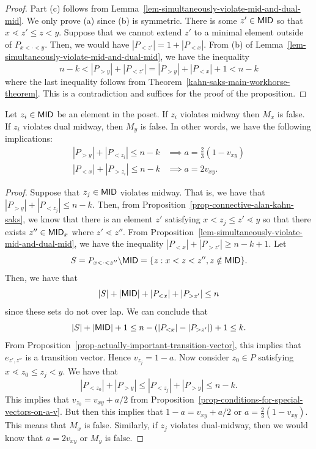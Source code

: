 \documentclass{puthesis-UG}
\begin{document}
\begin{proof}
 	Part (c) follows from Lemma~\ref{lem-simultaneously-violate-mid-and-dual-mid}. We only prove (a) since (b) is symmetric. There is some $z' \in \mathsf{MID}$ so that $x \lessdot z' \leq z < y$. Suppose that we cannot extend $z'$ to a minimal element outside of $P_{x< \cdot < y}$. Then, we would have $|P_{< z'}| = 1 + |P_{< x}|$. From (b) of Lemma~\ref{lem-simultaneously-violate-mid-and-dual-mid}, we have the inequality 
 	\[
 		n-k < |P_{> y}| + |P_{< z'}| = |P_{> y}| + |P_{< x}| + 1 < n-k
 	\]
 	where the last inequality follows from Theorem~\ref{kahn-saks-main-workhorse-theorem}. This is a contradiction and suffices for the proof of the proposition. 
\end{proof}

\begin{lem} \label{lem-midway-then-mx-false-and-other-version}
	Let $z_i \in \mathsf{MID}$ be an element in the poset. If $z_i$ violates midway then $M_x$ is false. If $z_i$ violates dual midway, then $M_y$ is false. In other words, we have the following implications:
	\begin{align*}
		|P_{> y}| + |P_{< z_i}| \leq n-k & \implies a = \frac{2}{3} (1 - v_{xy}) \\
		|P_{< x}| + |P_{> z_i}| \leq n-k & \implies a = 2v_{xy}. 
	\end{align*}
\end{lem}

\begin{proof}
	Suppose that $z_j \in \mathsf{MID}$ violates midway. That is, we have that $|P_{> y}| + |P_{<z_j}| \leq n-k$. Then, from Proposition~\ref{prop-connective-alan-kahn-saks}, we know that there is an element $z'$ satisfying $x < z_j \leq z' \lessdot y$ so that there exists $z'' \in \mathsf{MID}_x$ where $z' \lessdot z''$. From Proposition~\ref{lem-simultaneously-violate-mid-and-dual-mid}, we have the inequality $|P_{< x}| + |P_{>z'}| \geq n-k+1$. Let 
	\[
		S = P_{x < \cdot < z''} \backslash \mathsf{MID} = \{z : x < z < z'', z \notin \mathsf{MID}\}.
	\]
	Then, we have that 
	\[
		|S| + |\mathsf{MID}| + |P_{< x}| + |P_{>z'}| \leq n
	\]
	since these sets do not over lap. We can conclude that 
	\[
		|S| + |\mathsf{MID}| + 1 \leq n - (|P_{< x}| - |P_{> z'}|) + 1 \leq k.
	\]
	From Proposition~\ref{prop-actually-important-transition-vector}, this implies that $e_{z', z''}$ is a transition vector. Hence $v_{z_j} = 1-a$. Now consider $z_0 \in P$ satisfying $x \lessdot z_0 \leq z_j < y$. We have that 
	\[
		|P_{< z_0}| + |P_{> y}| \leq |P_{< z_j}| + |P_{> y}| \leq n-k.
	\]
	This implies that $v_{z_0} = v_{xy} + a/2$ from Proposition~\ref{prop-conditions-for-special-vectors-on-a-v}. But then this implies that $1 - a = v_{xy} + a/2$ or $a = \frac{2}{3} (1 - v_{xy})$. This means that $M_x$ is false. Similarly, if $z_j$ violates dual-midway, then we would know that $a = 2v_{xy}$ or $M_y$ is false.
\end{proof}
\end{document}
